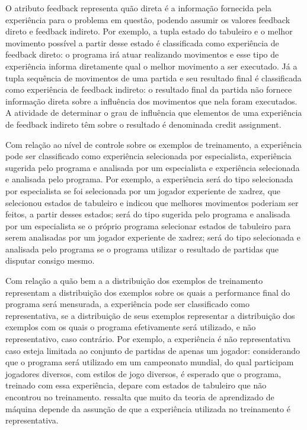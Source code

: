 O atributo feedback representa quão direta é a informação fornecida pela experiência para o problema em questão, podendo assumir os valores feedback direto e feedback indireto. Por exemplo, a tupla estado do tabuleiro e o melhor movimento possível a partir desse estado é classificada como experiência de feedback direto: o programa irá atuar realizando movimentos e esse tipo de experiência informa diretamente qual o melhor movimento a ser executado. Já a tupla sequência de movimentos de uma partida e seu resultado final é classificada como experiência de feedback indireto: o resultado final da partida não fornece informação direta sobre a influência dos movimentos que nela foram executados. A atividade de determinar o grau de influência que elementos de uma experiência de feedback indireto têm sobre o resultado é denominada credit assignment. 

Com relação ao nível de controle sobre os exemplos de treinamento, a experiência pode ser classificado como experiência selecionada por especialista, experiência sugerida pelo programa e analisada por um especialista e experiência selecionada e analisada pelo programa. Por exemplo, a experiência será do tipo selecionada por especialista se foi selecionada por um jogador experiente de xadrez, que selecionou estados de tabuleiro e indicou que melhores movimentos poderiam ser feitos, a partir desses estados; será do tipo sugerida pelo programa e analisada por um especialista se o próprio programa selecionar estados de tabuleiro para serem analisadas por um jogador experiente de xadrez; será do tipo selecionada e analisada pelo programa se o programa utilizar o resultado de partidas que disputar consigo mesmo.

Com relação a quão bem a a distribuição dos exemplos de treinamento representam a distribuição dos exemplos sobre os quais a performance final do programa será mensurada, a experiência pode ser classificado como representativa, se a distribuição de seus exemplos representar a distribuição dos exemplos com os quais o programa efetivamente será utilizado, e não representativo, caso contrário. Por exemplo, a experiência é não representativa caso esteja limitada ao conjunto de partidas de apenas um jogador: considerando que o programa será utilizado em um campeonato mundial, do qual participam jogadores diversos, com estilos de jogo diversos, é esperado que o programa, treinado com essa experiência, depare com estados de tabuleiro que não encontrou no treinamento. \cite{Tom_mitchell} ressalta que muito da teoria de aprendizado de máquina depende da assunção de que a experiência utilizada no treinamento é representativa.


